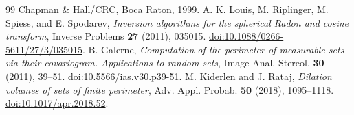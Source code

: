 \begin{thebibliography}{99}
Chapman \& Hall/CRC, Boca Raton, 1999.
A. K. Louis, M. Riplinger, M. Spiess, and E. Spodarev,
\emph{Inversion algorithms for the spherical Radon and cosine transform},
Inverse Problems \textbf{27} (2011), 035015.
\href{https://doi.org/10.1088/0266-5611/27/3/035015}
{doi:10.1088/0266-5611/27/3/035015}.
B. Galerne, \emph{Computation of the perimeter of measurable sets via
their covariogram. Applications to random sets},
Image Anal. Stereol. \textbf{30} (2011), 39--51.
\href{https://doi.org/10.5566/ias.v30.p39-51}
{doi:10.5566/ias.v30.p39-51}.
M. Kiderlen and J. Rataj, \emph{Dilation volumes of sets of finite perimeter},
Adv. Appl. Probab. \textbf{50} (2018), 1095--1118.
\href{https://doi.org/10.1017/apr.2018.52}{doi:10.1017/apr.2018.52}.
\end{thebibliography}

